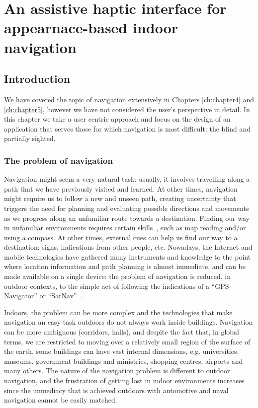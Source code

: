 \chapter{An assistive haptic interface for appearnace-based indoor navigation}\label{ch:chapter6}

\section{Introduction}
\label{sec:Intro}

We have covered the topic of navigation extensively in Chapters \ref{ch:chapter4} and \ref{ch:chapter5}, however we have not considered the user's perspective in detail. In this chapter we take a user centric approach and focus on the design of an application that serves those for which navigation is most difficult: the blind and partially sighted.

\subsection{The problem of navigation}

 Navigation might seem a very natural task: usually, it involves travelling along a path that we have previously visited and learned. At other times, navigation might require us to follow a new and unseen path, creating uncertainty that triggers the need for planning and evaluating possible directions and movements as we progress along an unfamiliar route towards a destination. Finding our way in unfamiliar environments requires certain skills~\citep{foulke1982perception}, such as map reading and/or using a compass. At other times, external cues can help us find our way to a destination: signs, indications from other people, etc. Nowadays, the Internet and mobile technologies have gathered many instruments and knowledge to the point where location information and path planning is almost immediate, and can be made available on a single device: the problem of navigation is reduced, in outdoor contexts, to the simple act of following the indications of a ``GPS Navigator'' or ``SatNav''~\citep{spirkovska2005summary}.

Indoors, the problem can be more complex and the technologies that make navigation an easy task outdoors do not always work inside buildings. Navigation can be more ambiguous (corridors, halls), and despite the fact that, in global terms, we are restricted to moving over a relatively small region of the surface of the earth, some buildings can have vast internal dimensions, e.g. universities, museums, government buildings and ministries, shopping centres, airports and many others. The nature of the navigation problem is different to outdoor navigation, and the frustration of getting lost in indoor environments increases since the immediacy that is achieved outdoors with automotive and naval navigation cannot be easily matched.
 
